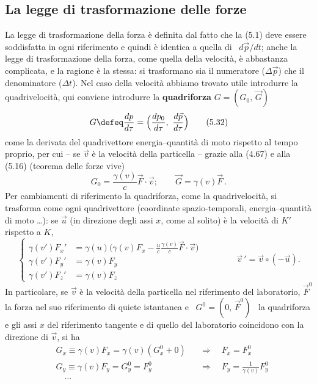 \subsection{La legge di trasformazione delle forze}

La legge di trasformazione della forza \`e definita dal fatto che la (5.1) deve
essere soddisfatta in ogni riferimento e quindi \`e identica a quella di
\ $d\vec p/dt$; anche la legge di trasformazione della forza, come quella della
velocit\`a, \`e abbastanza complicata, e la ragione \`e la stessa: si
trasformano sia il numeratore ($\Delta\vec p$) che il denominatore ($\Delta t$).
Nel caso della velocit\`a abbiamo trovato utile introdurre la quadrivelocit\`a,
qui conviene introdurre la \textbf{quadriforza} $G=(G_0,\,\vec G)$
\begin{equation}
  G\defeq\frac{dp}{d\tau}=\Big(\frac{dp_0}{d\tau},\ \frac{d\vec p}{d\tau}\Big)
  \tag{5.32}
\end{equation}
come la derivata del quadrivettore energia--quantit\`a di moto rispetto al tempo
proprio, per cui -- se $\vec v$ \`e la velocit\`a della particella -- grazie
alla (4.67) e alla (5.16) (teorema delle forze vive)
\begin{equation}
  G_0=\frac{\gamma(v)}{c}\vec F\cdot\vec v;\qquad\vec G=\gamma(v)\vec F\,.
  \tag{5.33}
\end{equation}
Per cambiamenti di riferimento la quadriforza, come la quadrivelocit\`a, si
trasforma come ogni quadrivettore (coordinate spazio-temporali,
energia--quantit\`a di moto \dots): se $\vec u$ (in direzione degli assi $x$,
come al solito) \`e la velocit\`a di $K'$ rispetto a $K$,
\begin{equation}
  \left\{\begin{aligned}
    \gamma(v')F_x'&=\gamma(u)
    \Big(\gamma(v)F_x-\frac{u}{c}\frac{\gamma(v)}{c}\vec F\cdot\vec v\Big)\\
    \gamma(v')F_y'&=\gamma(v)F_y\\
    \gamma(v')F_z'&=\gamma(v)F_z
  \end{aligned}\right.
  \qquad\qquad\vec v\,'=\vec v\circ(-\vec u).
  \tag{5.34}
\end{equation}
In particolare, se $\vec v$ \`e la velocit\`a della particella nel riferimento
del laboratorio, $\vec F^0$ la forza nel suo riferimento di quiete istantanea e
\ $G^0=(0,\,\vec F^0)$ \ la quadriforza e gli assi $x$ del riferimento tangente
e di quello del laboratorio coincidono con la direzione di $\vec v$, si ha
\begin{equation}
  \begin{aligned}
    &G_x\equiv\gamma(v)F_x=\gamma(v)(G_x^0+0)&&\Rightarrow\quad F_x=F_x^0\\
    &G_y\equiv\gamma(v)F_y=G_y^0=F_y^0
    &&\Rightarrow\quad F_y=\frac{1}{\gamma(v)}F_y^0\\
    &\quad\dots
  \end{aligned}
  \tag{5.35}
\end{equation}
